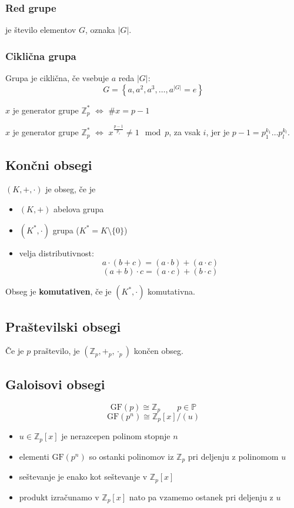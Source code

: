 \begin{multicols}{5}
\subsubsection{Red grupe}
je število elementov $G$, oznaka $|G|$.

\subsubsection*{Ciklična grupa}
Grupa je ciklična, če vsebuje $a$ reda $|G|$:
\[ G = \left\{ a, a^2, a^3, \dots, a^{|G|} = e\right\}\]

$x$ je generator grupe $\mathbb{Z}_p^*$ $\iff$ $\# x = p - 1$

$x$ je generator grupe $\mathbb{Z}_p^*$ $\iff$ $x^{\frac{p-1}{p_i}} \neq 1 \mod p$, za vsak $i$, jer je $p-1 = p_1^{k_1} \dots p_l^{k_l}$.

\subsection*{Končni obsegi}
$(K, +,\cdot)$ je obseg, če je
\begin{itemize}
	\item $(K, +)$ abelova grupa
	\item $(K^*, \cdot)$ grupa ($K^* = K \setminus \{0\}$)
	\item velja distributivnost:
	\[ a \cdot (b+c) = (a\cdot b) + (a \cdot c)\]
	\[ (a+b) \cdot c = (a\cdot c) + (b \cdot c)\]
\end{itemize}

Obseg je \textbf{komutativen}, če je $(K^*, \cdot)$ komutativna.

\subsection*{Praštevilski obsegi}
Če je $p$ praštevilo, je $(\mathbb{Z}_p, +_p, \cdot_p)$ končen obseg.


\subsection*{Galoisovi obsegi}
\[\text{GF}(p) \cong \mathbb{Z}_p \qquad p \in \mathbb{P}\]
\[ \text{GF}(p^n) \cong \mathbb{Z}_p[x]/(u) \]
\begin{itemize}
	\item $u \in \mathbb{Z}_p[x]$ je nerazcepen polinom stopnje $n$
	\item elementi $\text{GF}(p^n)$ so ostanki polinomov iz $\mathbb{Z}_p$ pri deljenju z polinomom $u$
	\item seštevanje je enako kot seštevanje v $\mathbb{Z}_p[x]$
	\item produkt izračunamo v $\mathbb{Z}_p[x]$ nato pa vzamemo ostanek pri deljenju z $u$
\end{itemize}


\end{multicols}
